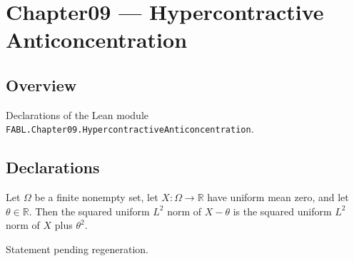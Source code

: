 \chapter{Chapter09 — Hypercontractive Anticoncentration}
\section{Overview}

Declarations of the Lean module \texttt{FABL.Chapter09.HypercontractiveAnticoncentration}.

\section{Declarations}

\begin{theorem}
\label{FABL.uniformLpNorm_two_sub_const_sq}
\leanok
{}
Let $\Omega$ be a finite nonempty set, let $X:\Omega\to\mathbb{R}$ have uniform mean
zero, and let $\theta\in\mathbb{R}$. Then the squared uniform $L^2$ norm of $X-\theta$
is the squared uniform $L^2$ norm of $X$ plus $\theta^2$.
\end{theorem}

\begin{theorem}
\label{FABL.translated_fourthMoment_le}
\leanok
{}
Statement pending regeneration.
\end{theorem}


